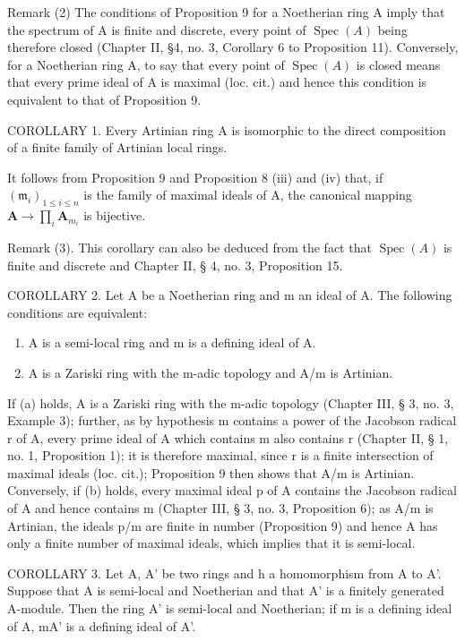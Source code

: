 Remark (2) The conditions of Proposition 9 for a Noetherian ring A imply that the spectrum of A is finite and discrete, every point of \(\operatorname{Spec}(A)\) being therefore closed (Chapter II, §4, no. 3, Corollary 6 to Proposition 11). Conversely, for a Noetherian ring A, to say that every point of \(\operatorname{Spec}(A)\) is closed means that every prime ideal of A is maximal (loc. cit.) and hence this condition is equivalent to that of Proposition 9.

COROLLARY 1. Every Artinian ring A is isomorphic to the direct composition of a finite family of Artinian local rings.

It follows from Proposition 9 and Proposition 8 (iii) and (iv) that, if \((\mathfrak{m}_i)_{1\leqslant i\leqslant n}\) is the family of maximal ideals of A, the canonical mapping \(\mathbf{A}\to \prod_{i}\mathbf{A}_{m_i}\) is bijective.

Remark (3). This corollary can also be deduced from the fact that \(\operatorname{Spec}(A)\) is finite and discrete and Chapter II, § 4, no. 3, Proposition 15.

COROLLARY 2. Let A be a Noetherian ring and m an ideal of A. The following conditions are equivalent:

\begin{enumerate}
\def\labelenumi{(\alph{enumi})}
\item
  A is a semi-local ring and m is a defining ideal of A.
\item
  A is a Zariski ring with the m-adic topology and A/m is Artinian.
\end{enumerate}

If (a) holds, A is a Zariski ring with the m-adic topology (Chapter III, § 3, no. 3, Example 3); further, as by hypothesis m contains a power of the Jacobson radical r of A, every prime ideal of A which contains m also contains r (Chapter II, § 1, no. 1, Proposition 1); it is therefore maximal, since r is a finite intersection of maximal ideals (loc. cit.); Proposition 9 then shows that A/m is Artinian. Conversely, if (b) holds, every maximal ideal p of A contains the Jacobson radical of A and hence contains m (Chapter III, § 3, no. 3, Proposition 6); as A/m is Artinian, the ideals p/m are finite in number (Proposition 9) and hence A has only a finite number of maximal ideals, which implies that it is semi-local.

COROLLARY 3. Let A, A' be two rings and h a homomorphism from A to A'. Suppose that A is semi-local and Noetherian and that A' is a finitely generated A-module. Then the ring A' is semi-local and Noetherian; if m is a defining ideal of A, mA' is a defining ideal of A'.

